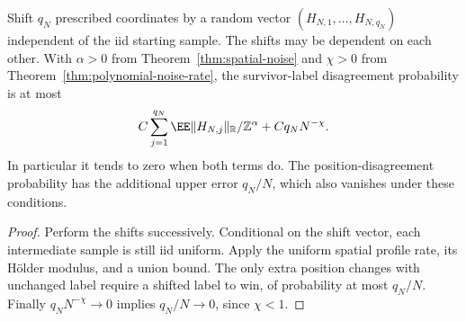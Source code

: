 \documentclass[11pt,letterpaper]{article}
\newcommand{\T}{\mathbb R/\mathbb Z}\newcommand{\Leb}{\operatorname{Leb}}
\begin{document}
\begin{corollary}
\label{cor:growing-spatial-stability}
Shift $q_N$ prescribed coordinates by a random vector
$(H_{N,1},\ldots,H_{N,q_N})$ independent of the iid starting sample.
The shifts may be dependent on each other. With $\alpha>0$ from
Theorem~\ref{thm:spatial-noise} and $\chi>0$ from
Theorem~\ref{thm:polynomial-noise-rate}, the survivor-label
disagreement probability is at most
\[
 C\sum_{j=1}^{q_N}\EE\|H_{N,j}\|_\T^\alpha
       +Cq_N N^{-\chi}.
\]
In particular it tends to zero when both terms do.
The position-disagreement probability has the additional upper error
$q_N/N$, which also vanishes under these conditions.
\end{corollary}
\begin{proof}
Perform the shifts successively. Conditional on the shift vector,
each intermediate sample is still iid uniform. Apply the uniform
spatial profile rate, its H\"older modulus, and a union bound.
The only extra position changes with unchanged label require a
shifted label to win, of probability at most $q_N/N$.
Finally $q_N N^{-\chi}\to0$ implies $q_N/N\to0$, since $\chi<1$.
\end{proof}
\end{document}
